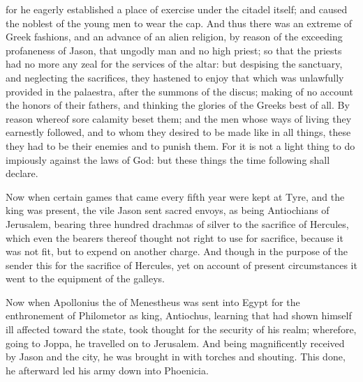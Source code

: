 {for he eagerly established a
{} place of exercise under the citadel itself; and caused the noblest of the young men to wear the
{} cap.
And thus there was an extreme of Greek fashions, and an advance of an alien religion, by reason of the exceeding profaneness of Jason, that ungodly man and no high priest;
so that the priests had no more any zeal for the services of the altar: but despising the sanctuary, and neglecting the sacrifices, they hastened to
 enjoy that which was unlawfully provided in the palaestra, after the summons
 of the discus;
making of no account the honors of their fathers, and thinking the glories of the Greeks best of all.
By reason whereof sore calamity beset them; and the men whose ways of living they earnestly followed, and to whom they desired to be made like in all things, these they had to be their enemies and to punish them.
For it is not a light thing to do impiously against the laws of God: but
 these things the time following shall declare.
\par }{\PP {}Now when certain games that came every fifth year were kept at Tyre, and the king was present,
the vile Jason sent sacred envoys,
 as being Antiochians of Jerusalem, bearing three hundred drachmas of silver to the sacrifice of Hercules, which even the bearers thereof thought not right to use for
{} sacrifice, because it was not fit, but to
 expend on another charge.
And though in the purpose of the sender this
{} for the sacrifice of Hercules, yet on account of
 present circumstances it went to the equipment of the galleys.
\par }{\PP {}Now when Apollonius the
{} of Menestheus was sent into Egypt for the
 enthronement of
{} Philometor as king, Antiochus, learning that
{} had shown himself ill affected toward the state, took thought for the security of his realm; wherefore, going
{} to Joppa, he travelled on to Jerusalem.
And being magnificently received by Jason and the city, he was brought in with torches and shouting. This done, he afterward led his army down into Phoenicia.
}
